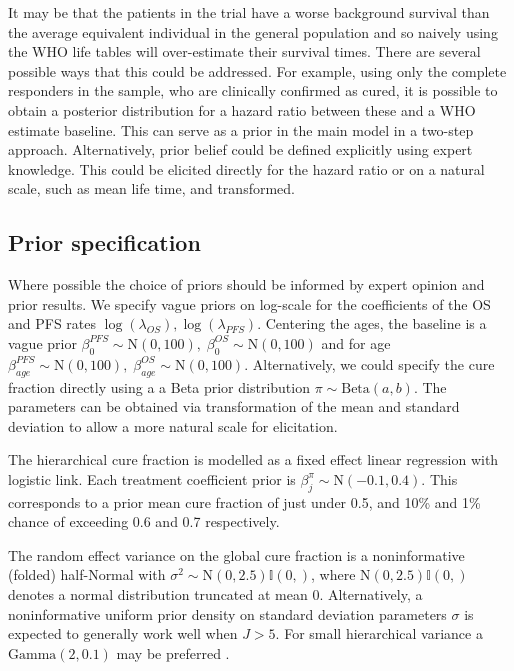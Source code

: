 \documentclass[AMA,STIX1COL]{WileyNJD-v2}
\begin{document}
It may be that the patients in the trial have a worse background survival than the average equivalent individual in the general population and so naively using the WHO life tables will over-estimate their survival times.
There are several possible ways that this could be addressed.
For example, using only the complete responders in the sample, who are clinically confirmed as cured, it is possible to obtain a posterior distribution for a hazard ratio between these and a WHO estimate baseline.
This can serve as a prior in the main model in a two-step approach. Alternatively, prior belief could be defined explicitly using expert knowledge.
This could be elicited directly for the hazard ratio or on a natural scale, such as mean life time, and transformed.

%
\subsection{Prior specification}
Where possible the choice of priors should be informed by expert opinion and prior results.
We specify vague priors on log-scale for the coefficients of the OS and PFS rates $\log(\lambda_{OS}),  \log(\lambda_{PFS})$.
Centering the ages, the baseline is a vague prior ${\beta_0^{PFS} \sim \text{N}(0, 100),}\; {\beta_0^{OS} \sim \text{N}(0, 100)}$
and for age $\beta_{age}^{PFS} \sim \text{N}(0, 100),\; \beta_{age}^{OS} \sim \text{N}(0, 100)$.
Alternatively, we could specify the cure fraction directly using a a Beta prior distribution $\pi \sim \text{Beta}(a, b)$.
The parameters can be obtained via transformation of the mean and standard deviation to allow a more natural scale for elicitation.

The hierarchical cure fraction is modelled as a fixed effect linear regression with logistic link. Each treatment coefficient prior is $\beta^{\pi}_j \sim \text{N}(-0.1, 0.4)$.
This corresponds to a prior mean cure fraction of just under 0.5, and 10\% and 1\% chance of exceeding 0.6 and 0.7 respectively.  

The random effect variance on the global cure fraction is a noninformative (folded) half-Normal \cite{Gelman2006} with 
${\sigma^2 \sim \text{N}(0, 2.5)\mathbb{I}(0,)}$, where $\text{N}(0, 2.5)\mathbb{I}(0,)$ denotes a normal distribution truncated at mean 0.
Alternatively, a noninformative uniform prior density on standard deviation parameters $\sigma$ is expected to generally work well when $J > 5$.
For small hierarchical variance a $\text{Gamma}(2, 0.1)$ may be preferred \cite{Chung2013}.
\end{document}
